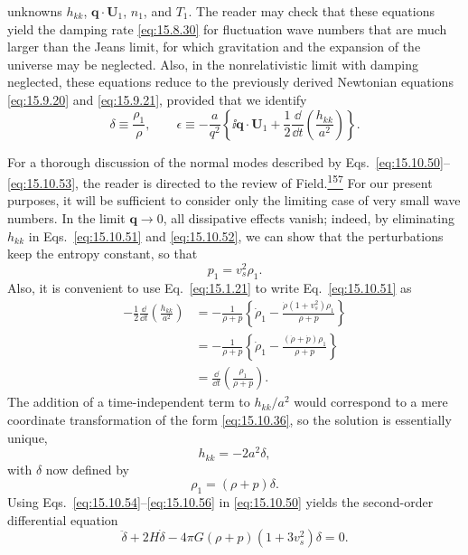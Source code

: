 unknowns \(h_{kk}\), \(\mathbf q\cdot\mathbf U_1\), \(n_1\), and \(T_1\).
The reader may check that these equations yield the damping rate
\eqref{eq:15.8.30} for fluctuation wave numbers that are much larger than the
Jeans limit, for which gravitation and the expansion of the universe may be
neglected. Also, in the nonrelativistic limit with damping neglected, these
equations reduce to the previously derived Newtonian equations
\eqref{eq:15.9.20} and \eqref{eq:15.9.21}, provided that we identify
\[
  \delta\equiv\frac{\rho_1}{\rho},
  \qquad
  \epsilon
  \equiv
  -\frac a{q^2}
  \left\{
    \ii\mathbf q\cdot\mathbf U_1
    +\frac12\frac{\dd}{\dd t}\left(\frac{h_{kk}}{a^2}\right)
  \right\}.
\]

For a thorough discussion of the normal modes described by
Eqs.~\eqref{eq:15.10.50}--\eqref{eq:15.10.53}, the reader is directed to
the review of Field.\hyperref[ch15-ref-157]{\textsuperscript{157}} For our
present purposes, it will be sufficient to consider only the limiting case of
very small wave numbers. In the limit \(\mathbf q\to0\), all dissipative
effects vanish; indeed, by eliminating \(h_{kk}\) in
Eqs.~\eqref{eq:15.10.51} and \eqref{eq:15.10.52}, we can show that the
perturbations keep the entropy constant, so that
\begin{equation}
  p_1=v_s^2\rho_1.
  \tag{15.10.54}\label{eq:15.10.54}
\end{equation}
Also, it is convenient to use Eq.~\eqref{eq:15.1.21} to write
Eq.~\eqref{eq:15.10.51} as
\[
  \begin{aligned}
  -\frac12\frac{\dd}{\dd t}\left(\frac{h_{kk}}{a^2}\right)
  &=
  -\frac1{\rho+p}
  \left\{
    \dot\rho_1
    -\frac{\dot\rho(1+v_s^2)\rho_1}{\rho+p}
  \right\}\\
  &=
  -\frac1{\rho+p}
  \left\{
    \dot\rho_1
    -\frac{(\dot\rho+\dot p)\rho_1}{\rho+p}
  \right\}\\
  &=
  \frac{\dd}{\dd t}\left(\frac{\rho_1}{\rho+p}\right).
  \end{aligned}
\]
The addition of a time-independent term to \(h_{kk}/a^2\) would correspond
to a mere coordinate transformation of the form \eqref{eq:15.10.36}, so the
solution is essentially unique,
\begin{equation}
  h_{kk}=-2a^2\delta,
  \tag{15.10.55}\label{eq:15.10.55}
\end{equation}
with \(\delta\) now defined by
\begin{equation}
  \rho_1=(\rho+p)\delta.
  \tag{15.10.56}\label{eq:15.10.56}
\end{equation}
Using Eqs.~\eqref{eq:15.10.54}--\eqref{eq:15.10.56} in
\eqref{eq:15.10.50} yields the second-order differential equation
\begin{equation}
  \ddot\delta
  +2H\dot\delta
  -4\pi G(\rho+p)(1+3v_s^2)\delta
  =0.
  \tag{15.10.57}\label{eq:15.10.57}
\end{equation}

